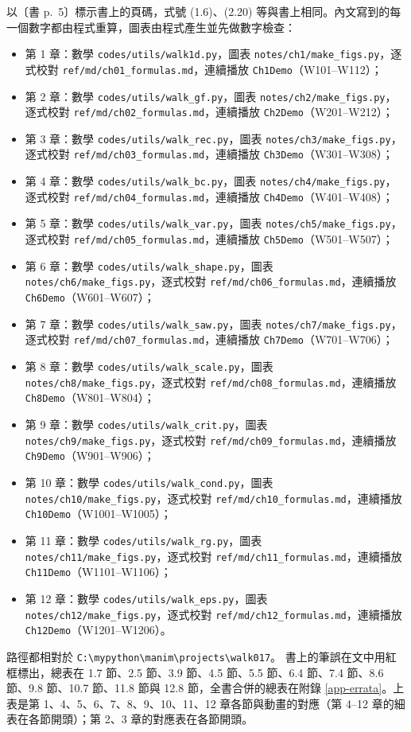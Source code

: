 \documentclass[11pt,a4paper]{article}
\begin{document}
\noindent 以〔書 p.~5〕標示書上的頁碼，式號 (1.6)、(2.20) 等與書上相同。內文寫到的每一個數字都由程式重算，圖表由程式產生並先做數字檢查：
\begin{itemize}[nosep]
\item 第 1 章：數學 \texttt{codes/utils/walk1d.py}，圖表 \texttt{notes/ch1/make\_figs.py}，逐式校對 \texttt{ref/md/ch01\_formulas.md}，連續播放 \texttt{Ch1Demo}（W101--W112）；
\item 第 2 章：數學 \texttt{codes/utils/walk\_gf.py}，圖表 \texttt{notes/ch2/make\_figs.py}，逐式校對 \texttt{ref/md/ch02\_formulas.md}，連續播放 \texttt{Ch2Demo}（W201--W212）；
\item 第 3 章：數學 \texttt{codes/utils/walk\_rec.py}，圖表 \texttt{notes/ch3/make\_figs.py}，逐式校對 \texttt{ref/md/ch03\_formulas.md}，連續播放 \texttt{Ch3Demo}（W301--W308）；
\item 第 4 章：數學 \texttt{codes/utils/walk\_bc.py}，圖表 \texttt{notes/ch4/make\_figs.py}，逐式校對 \texttt{ref/md/ch04\_formulas.md}，連續播放 \texttt{Ch4Demo}（W401--W408）；
\item 第 5 章：數學 \texttt{codes/utils/walk\_var.py}，圖表 \texttt{notes/ch5/make\_figs.py}，逐式校對 \texttt{ref/md/ch05\_formulas.md}，連續播放 \texttt{Ch5Demo}（W501--W507）；
\item 第 6 章：數學 \texttt{codes/utils/walk\_shape.py}，圖表 \texttt{notes/ch6/make\_figs.py}，逐式校對 \texttt{ref/md/ch06\_formulas.md}，連續播放 \texttt{Ch6Demo}（W601--W607）；
\item 第 7 章：數學 \texttt{codes/utils/walk\_saw.py}，圖表 \texttt{notes/ch7/make\_figs.py}，逐式校對 \texttt{ref/md/ch07\_formulas.md}，連續播放 \texttt{Ch7Demo}（W701--W706）；
\item 第 8 章：數學 \texttt{codes/utils/walk\_scale.py}，圖表 \texttt{notes/ch8/make\_figs.py}，逐式校對 \texttt{ref/md/ch08\_formulas.md}，連續播放 \texttt{Ch8Demo}（W801--W804）；
\item 第 9 章：數學 \texttt{codes/utils/walk\_crit.py}，圖表 \texttt{notes/ch9/make\_figs.py}，逐式校對 \texttt{ref/md/ch09\_formulas.md}，連續播放 \texttt{Ch9Demo}（W901--W906）；
\item 第 10 章：數學 \texttt{codes/utils/walk\_cond.py}，圖表 \texttt{notes/ch10/make\_figs.py}，逐式校對 \texttt{ref/md/ch10\_formulas.md}，連續播放 \texttt{Ch10Demo}（W1001--W1005）；
\item 第 11 章：數學 \texttt{codes/utils/walk\_rg.py}，圖表 \texttt{notes/ch11/make\_figs.py}，逐式校對 \texttt{ref/md/ch11\_formulas.md}，連續播放 \texttt{Ch11Demo}（W1101--W1106）；
\item 第 12 章：數學 \texttt{codes/utils/walk\_eps.py}，圖表 \texttt{notes/ch12/make\_figs.py}，逐式校對 \texttt{ref/md/ch12\_formulas.md}，連續播放 \texttt{Ch12Demo}（W1201--W1206）。
\end{itemize}
路徑都相對於 \texttt{C:\textbackslash mypython\textbackslash manim\textbackslash projects\textbackslash walk017}。
書上的筆誤在文中用紅框標出，總表在 1.7 節、2.5 節、3.9 節、4.5 節、5.5 節、6.4 節、7.4 節、8.6 節、9.8 節、10.7 節、11.8 節與 12.8 節，全書合併的總表在附錄 \ref{app-errata}。上表是第 1、4、5、6、7、8、9、10、11、12 章各節與動畫的對應（第 4--12 章的細表在各節開頭）；第 2、3 章的對應表在各節開頭。
\end{document}
